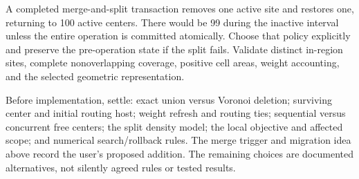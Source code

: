 A completed merge-and-split transaction removes one active site and restores
one, returning to 100 active centers. There would be 99 during the inactive
interval unless the entire operation is committed atomically. Choose that
policy explicitly and preserve the pre-operation state if the split fails.
Validate distinct in-region sites, complete nonoverlapping coverage, positive
cell areas, weight accounting, and the selected geometric representation.

Before implementation, settle: exact union versus Voronoi deletion; surviving
center and initial routing host; weight refresh and routing ties; sequential
versus concurrent free centers; the split density model; the local objective
and affected scope; and numerical search/rollback rules. The merge trigger and
migration idea above record the user's proposed addition. The remaining
choices are documented alternatives, not silently agreed rules or tested
results.
